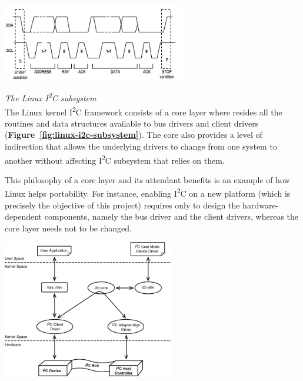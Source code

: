 \documentclass[a4paper,10pt]{article}
\makeatletter
\newenvironment{figurehere}{\def\@captype{figure}\vspace{2ex}}{\vspace{2ex}}
\newcommand{\iic}{I\textsuperscript{2}C }
\newcommand{\reff}[1]{\textbf{Figure~\ref{#1}}}
\makeatother
\begin{document}
\begin{multicols}{2}
\begin{figurehere}
 \centering
 \includegraphics[width=8cm]{./figures/i2c-transaction.jpg}
 \caption{Sample \iic transaction (adapted from \emph{www.ermicro/blog}).}
 \label{fig:i2c-transaction}
\end{figurehere}

\emph{The Linux \iic subsystem}\\[6pt]
The Linux kernel \iic framework consists of a core layer where resides all the
routines and data structures available to bus drivers and client drivers
(\reff{fig:linux-i2c-subsystem}).
The core also provides a level of indirection that allows the underlying drivers
to change from one system to another without affecting \iic subsystem that
relies on them.

This philosophy of a core layer and its attendant benefits is an example of how
Linux helps portability. For instance, enabling \iic on a new platform (which is
precisely the objective of this project) requires only to design the
hardware-dependent components, namely the bus driver and the client drivers,
whereas the core layer needs not to be changed.

\begin{figurehere}
 \centering
 \includegraphics[width=7.5cm]{./figures/linux-i2c-subsystem.png}
 \caption{The Linux \iic subsystem (reprinted from \cite{venkateswaran2008eldd},
 		p. 236).}
 \label{fig:linux-i2c-subsystem}
\end{figurehere}




\end{multicols}
\end{document}
